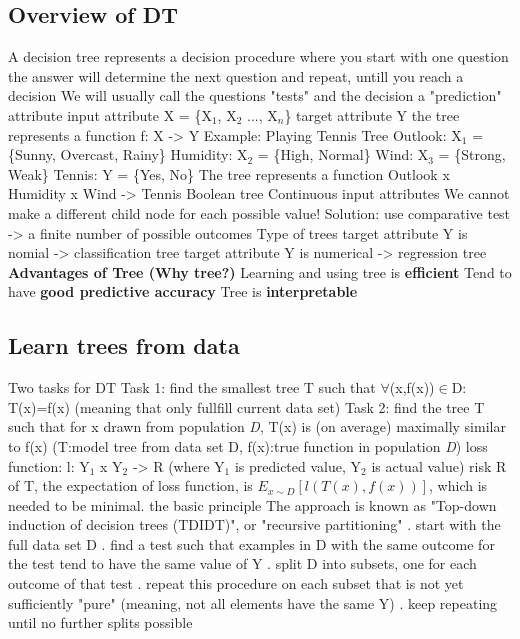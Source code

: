 \subsection{Overview of DT}
\begin{outline}
    \1 A decision tree represents a decision procedure where
        \2 you start with one question
        \2 the answer will determine the next question
        \2 and repeat, untill you reach a decision
    \1 We will usually call the questions "tests" and the decision a "prediction"
    \1 attribute
        \2 input attribute X = \{X$_{1}$, X$_{2}$ ..., X$_{n}$\}
        \2 target attribute Y
        \2 the tree represents a function f: X -> Y
    \1 Example: Playing Tennis Tree
        \2 Outlook: X$_{1}$ = \{Sunny, Overcast, Rainy\}
        \2 Humidity: X$_{2}$ = \{High, Normal\}
        \2 Wind: X$_{3}$ = \{Strong, Weak\}
        \2 Tennis: Y = \{Yes, No\}
        \2 The tree represents a function Outlook x Humidity x Wind -> Tennis
    \1 Boolean tree
    \1 Continuous input attributes
        \2 We cannot make a different child node for each possible value!
        \2 Solution: use comparative test -> a finite number of possible outcomes
    \1 Type of trees
        \2 target attribute Y is nomial -> classification tree
        \2 target attribute Y is numerical -> regression tree
    \1 \textbf{Advantages of Tree (Why tree?)}
        \2 Learning and using tree is \textbf{efficient}
        \2 Tend to have \textbf{good predictive accuracy}
        \2 Tree is \textbf{interpretable}
\end{outline}

\subsection{Learn trees from data}
\begin{outline}
    \1 Two tasks for DT
        \2 Task 1: find the smallest tree T such that $\forall$(x,f(x))$\in$D: T(x)=f(x) (meaning that only fullfill current data set)
        \2 Task 2: find the tree T such that for x drawn from population \emph{D}, T(x) is (on average) maximally similar to f(x) (T:model tree from data set D, f(x):true function in population \emph{D})
            \3 loss function: l: Y$_{1}$ x Y$_{2}$ -> R (where Y$_{1}$ is predicted value, Y$_{2}$ is actual value)
            \3 risk R of T, the expectation of loss function, is $E_{x{\sim}D}[l(T(x),f(x))]$, which is needed to be minimal.
    \1 the basic principle
        \2 The approach is known as "Top-down induction of decision trees (TDIDT)", or "recursive partitioning"
            . start with the full data set D
            . find a test such that examples in D with the same outcome for the test tend to have the same value of Y
            . split D into subsets, one for each outcome of that test
            . repeat this procedure on each subset that is not yet sufficiently "pure" (meaning, not all elements have the same Y)
            . keep repeating until no further splits possible
    
\end{outline}
